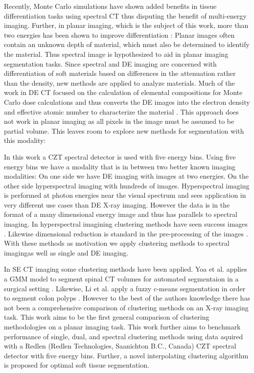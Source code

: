 \documentclass[a4paper,11pt]{article}
\begin{document}
Recently, Monte Carlo simulations have shown added benefits in tissue differentiation tasks using spectral CT \cite{Lalonde2016ACT} thus disputing the benefit of multi-energy imaging. Further, in planar imaging, which is the subject of this work, more than two energies has been shown to improve differentiation \cite{OConnell2019OptimalDetector}: Planar images often contain an unknown depth of material, which must also be determined to identify the material. Thus spectral image is hypothesized to aid in planar imaging segmentation tasks. Since spectral and DE imaging are concerned with differentiation of soft materials based on differences in the attenuation rather than the density, new methods are applied to analyze materials. Much of the work in DE CT focused on the calculation of elemental compositions for Monte Carlo dose calculations and thus converts the DE images into the electron density and effective atomic number to characterize the material \cite{Bazalova2008Dual-energyCalculations,Landry2013DerivingCoefficients,Saito2017ABody}. This approach does not work in planar imaging as all pixels in the image must be assumed to be partial volume. This leaves room to explore new methods for segmentation with this modality:

In this work a CZT spectral detector is used with five energy bins. Using five energy bins we have a modality that is in between two better known imaging modalities: On one side we have DE imaging with images at two energies. On the other side hyperspectral imaging with hundreds of images. Hyperspectral imaging is performed at photon energies near the visual spectrum and sees application in very different use cases than DE X-ray imaging. However the data is in the format of a many dimensional energy image and thus has parallels to spectral imaging. In hyperspectral imagining clustering methods have seen success images \cite{Murphy2018UnsupervisedDiffusion,Gillis2012HyperspectralGraphs,Noe2001PartialClustering}. Likewise dimensional reduction is standard in the pre-processing of the images \cite{Mahesh2015HyperspectralMaterials}. With these methods as motivation we apply clustering methods to spectral imagingas well as single and DE imaging.

In SE CT imaging some clustering methods have been applied. Yoa et al. applies a GMM model to segment spinal CT volumes for automated segmentaion in a surgical setting \cite{Yao2004ColonicModels}. Likewise, Li et al. apply a fuzzy c-means segmentation in order to segment colon polyps \cite{Li2008ImprovedRadiography}. However to the best of the authors knowledge there has not been a comprehensive comparison of clustering methods on an X-ray imaging task. This work aims to be the first general comparison of clustering methodologies on a planar imaging task. This work further aims to benchmark performance of single, dual, and spectral clustering methods using data aquired with a Redlen (Redlen Technologies, Saanichton B.C., Canada) CZT spectral detector with five energy bins. Further, a novel interpolating clustering algorithm is proposed for optimal soft tissue segmentation.
\end{document}
